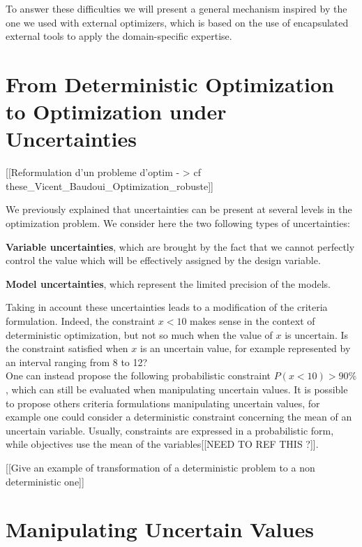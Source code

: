 To answer these difficulties we will present a general mechanism inspired by the one we used with external optimizers, which is based on the use of encapsulated external tools to apply the domain-specific expertise.

\section{From Deterministic Optimization to Optimization under Uncertainties}

[[Reformulation d'un probleme d'optim - > cf these_Vicent_Baudoui_Optimization_robuste]]

We previously explained that uncertainties can be present at several levels in the optimization problem. We consider here the two following types of uncertainties:
\begin{compactitem}
\item \textbf{Variable uncertainties}, which are brought by the fact that we cannot perfectly control the value which will be effectively assigned by the design variable.
\item \textbf{Model uncertainties}, which represent the limited precision of the models.
\end{compactitem}

Taking in account these uncertainties leads to a modification of the criteria formulation. Indeed, the constraint $x < 10$ makes sense in the context of deterministic optimization, but not so much when the value of $x$ is uncertain. Is the constraint satisfied when $x$ is an uncertain value, for example represented by an interval ranging from 8 to 12?\\
One can instead propose the following probabilistic constraint $P(x < 10) > 90\%$, which can still be evaluated when manipulating uncertain values. It is possible to propose others criteria formulations manipulating uncertain values, for example one could consider a deterministic constraint concerning the mean of an uncertain variable. Usually, constraints are expressed in a probabilistic form, while objectives use the mean of the variables[[NEED TO REF THIS ?]].

[[Give an example of transformation of a deterministic problem to a non deterministic one]]

\section{Manipulating Uncertain Values}

